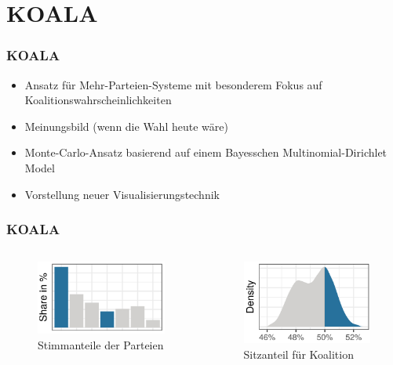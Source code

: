 \documentclass[aspectratio=169,xcolor=dvipsnames]{beamer}
\begin{document}
\section{KOALA}

\begin{frame}
\frametitle{KOALA}
\begin{itemize}
\item Ansatz für Mehr-Parteien-Systeme mit besonderem Fokus auf Koalitionswahrscheinlichkeiten
\item Meinungsbild (wenn die Wahl heute wäre) 
\item Monte-Carlo-Ansatz basierend auf einem Bayesschen Multinomial-Dirichlet Model
\item Vorstellung neuer Visualisierungstechnik
\end{itemize}
\end{frame}

\begin{frame}
\frametitle{KOALA}
\begin{columns}
\begin{column}{0.5\textwidth}
\begin{figure}[t!]
\includegraphics[height=0.5\textheight]{partyshare}
\caption{Stimmanteile der Parteien}
\end{figure}
\end{column}
\begin{column}{0.5\textwidth}
\begin{figure}[h!]
\includegraphics[height=0.5\textheight]{poe}
\caption{Sitzanteil für Koalition}
\end{figure}
\end{column}
\end{columns}
\end{frame}
\end{document}
